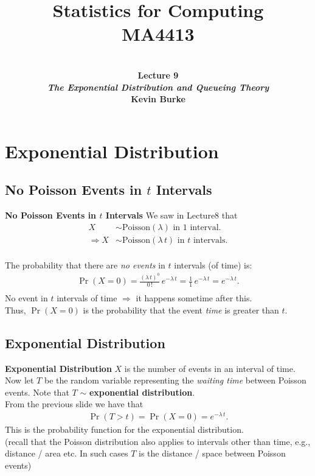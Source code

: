\documentclass[compress]{beamer}        %
\title{{\huge Statistics for Computing\\[0.1cm]MA4413}}
\author[Kevin Burke]{{\bf\\[0.5cm]{\huge Lecture 9}\\[0.2cm]\emph{The Exponential Distribution and Queueing Theory}\\[1.4cm]Kevin Burke}\\[0.3cm]\tcb{kevin.burke@ul.ie}}
\institute[University of Limerick, Maths \& Stats Dept]{}
\date{}
\makeatletter
\newcommand{\tcb}{\textcolor{beamer@blendedblue}}
\makeatother
\begin{document}
\begin{frame}[t]
\titlepage
\end{frame}



\section{Exponential Distribution}
\subsection{No Poisson Events in $t$ Intervals}
\begin{frame}{\bf \tcb{No Poisson Events in $t$ Intervals}}
We saw in Lecture8 that
\begin{align*}
X &\sim \text{Poisson}(\lambda) \text{ in 1 interval}.\\[0.3cm]
\Rightarrow X &\sim \text{Poisson}(\lambda\,t) \text{ in $t$ intervals}.\\
\end{align*}

The probability that there are \emph{no events} in $t$ intervals (of time) is:\\[-0.5cm]
\begin{align*}
\Pr(X = 0) = \frac{(\lambda\,t)^0}{0\,!}\,e^{-\lambda\,t} = \frac{1}{1} \,e^{-\lambda\,t} = e^{-\lambda\,t}.\\[-0.2cm]
\end{align*}
No event in $t$ intervals of time $\Rightarrow$ it happens sometime after this.\\[0.3cm]
Thus, $\Pr(X=0)$ is the probability that the event \emph{time} is greater than $t$.
\end{frame}

\subsection{Exponential Distribution}
\begin{frame}{\bf \tcb{Exponential Distribution}}
$X$ is the number of events in an interval of time.\\[0.6cm]

Now let $T$ be the random variable representing the \emph{waiting time} between Poisson events. Note that $T$ $\sim$ {\bf exponential distribution}.\\[0.6cm]

From the previous slide we have that
\begin{align*}
\Pr(T > t) = \Pr(X = 0) = e^{-\lambda\,t}.
\end{align*}
This is the probability function for the exponential distribution.\\[0.7cm]
{\footnotesize(recall that the Poisson distribution also applies to intervals other than time, e.g., distance / area etc. In such cases $T$ is the distance / space between Poisson events)}

\end{frame}
\end{document}
